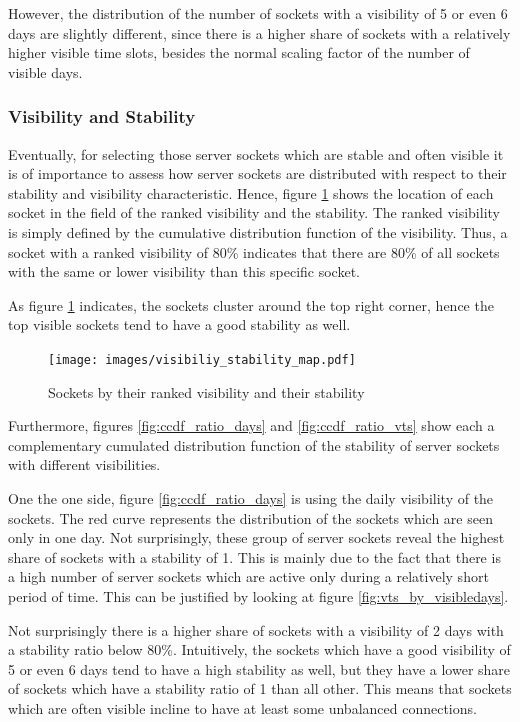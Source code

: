 However, the distribution of the number of sockets with a visibility of 5 or even 6 days are slightly different, since there is a higher share of sockets with a relatively higher visible time slots, besides the normal scaling factor of the number of visible days.

\subsubsection{Visibility and Stability}
Eventually, for selecting those \glspl{server socket} which are stable and often visible it is of importance to assess how \glspl{server socket} are distributed with respect to their stability and visibility characteristic.
Hence, figure \ref{fig:rankedVisibility} shows the location of each socket in the field of the ranked visibility and the stability.
The ranked visibility is simply defined by the cumulative distribution function of the visibility.
Thus, a socket with a ranked visibility of 80\% indicates that there are 80\% of all sockets with the same or lower visibility than this specific socket.

As figure \ref{fig:rankedVisibility} indicates, the sockets cluster around the top right corner, hence the top visible sockets tend to have a good stability as well.

\begin{figure}
	[hb] \centering
	\texttt{[image: images/visibiliy\_stability\_map.pdf]}
	\caption{Sockets by their ranked visibility and their stability}
	\label{fig:rankedVisibility}
\end{figure}

Furthermore, figures \ref{fig:ccdf_ratio_days} and \ref{fig:ccdf_ratio_vts} show each a complementary cumulated distribution function of the stability of server sockets with different visibilities.

One the one side, figure \ref{fig:ccdf_ratio_days} is using the daily visibility of the sockets.
The red curve represents the distribution of the sockets which are seen only in one day.
Not surprisingly, these group of \glspl{server socket} reveal the highest share of sockets with a stability of 1. 
This is mainly due to the fact that there is a high number of \glspl{server socket} which are active only during a relatively short period of time. This can be justified by looking at figure \ref{fig:vts_by_visibledays}.

Not surprisingly there is a higher share of sockets with a visibility of 2 days
with a stability ratio below 80\%.
Intuitively, the sockets which have a good visibility of 5 or even 6 days tend to have a high stability as well, but they have a lower share of sockets which have a stability ratio of 1 than all other.
This means that sockets which are often visible incline to have at least some unbalanced connections.

